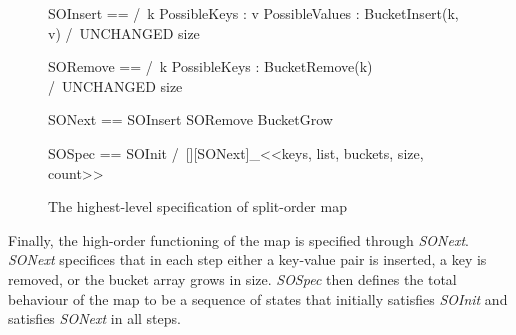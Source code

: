 \documentclass{uit-thesis}
\begin{document}
\begin{figure}
    \begin{tla}
        SOInsert == /\  \E k \in PossibleKeys :
                    \E v \in PossibleValues :
                        BucketInsert(k, v)
            /\ UNCHANGED size

SORemove == /\  \E k \in PossibleKeys :
                    BucketRemove(k)
            /\ UNCHANGED size

SONext ==   \/ SOInsert
            \/ SORemove
            \/ BucketGrow

SOSpec == SOInit /\ [][SONext]_<<keys, list, buckets, size, count>>

\end{tla}
\begin{tlatex}
%
%
%
\@pvspace{8.0pt}%
%
%
\@pvspace{8.0pt}%
%
%
%
\@pvspace{8.0pt}%
\@pvspace{8.0pt}%
\end{tlatex}
\caption{The highest-level specification of split-order map}
\label{fig:SO-spec}
\end{figure}

Finally, the high-order functioning of the map is specified through \textit{SONext}. \textit{SONext} specifices that in each step either a key-value pair is inserted, a key is removed, or the bucket array grows in size. \textit{SOSpec} then defines the total behaviour of the map to be a sequence of states that initially satisfies \textit{SOInit} and satisfies \textit{SONext} in all steps.
\end{document}
